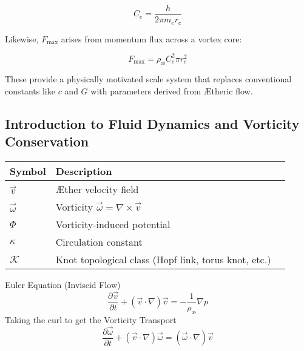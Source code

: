 \documentclass[aps,preprint,superscriptaddress]{revtex4}
\begin{document}
\[
    C_e = \frac{h}{2\pi m_e r_c}
\]

Likewise, $F_{\text{max}}$ arises from momentum flux across a vortex core:

\[
    F_{\text{max}} = \rho_{\text{\ae}} C_e^2 \pi r_c^2
\]

These provide a physically motivated scale system that replaces conventional constants like $c$ and $G$ with parameters derived from Ætheric flow.


\subsection*{Introduction to Fluid Dynamics and Vorticity Conservation}

    \begin{table}[h!]
        \centering
        \begin{tabular}{llc}
            \hline
            Symbol & Description \\
            \hline
            \midrule
            \(\vec{v}\) & Æther velocity field \\
            \(\vec{\omega}\) &  Vorticity \(\vec{\omega} = \nabla \times \vec{v}\) \\
            \(\Phi\) & Vorticity-induced potential \\
            \(\kappa\) & Circulation constant \\
            \(\mathcal{K}\) & Knot topological class (Hopf link, torus knot, etc.) \\
            \bottomrule
            \hline
        \end{tabular}
    \end{table}

    Euler Equation (Inviscid Flow)
    \begin{equation}
        \frac{\partial \vec{v}}{\partial t} + (\vec{v} \cdot \nabla)\vec{v} = -\frac{1}{\rho_\text{æ}} \nabla p
    \end{equation}
    Taking the curl to get the Vorticity Transport
    \begin{equation}
        \frac{\partial \vec{\omega}}{\partial t} + (\vec{v} \cdot \nabla)\vec{\omega} = (\vec{\omega} \cdot \nabla) \vec{v}
    \end{equation}
\end{document}
